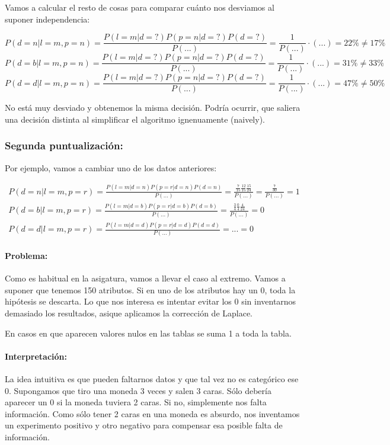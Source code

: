 \documentclass{apuntes}
\begin{document}
Vamos a calcular el resto de cosas para comparar cuánto nos desviamos al suponer independencia:

\[ P(d=n | l=m,p=n) = \frac{P(l=m | d=?) P(p=n | d=?) P(d=?)}{P(...)} = \frac{1}{P(...)}·\left( ... \right) = 22\% ≠ 17\% \]
\[ P(d=b | l=m,p=n) = \frac{P(l=m | d=?) P(p=n | d=?) P(d=?)}{P(...)} = \frac{1}{P(...)}·\left( ... \right) = 31\% ≠ 33\% \]
\[ P(d=d | l=m,p=n) = \frac{P(l=m | d=?) P(p=n | d=?) P(d=?)}{P(...)} = \frac{1}{P(...)}·\left( ... \right) = 47\% ≠ 50\% \]

No está muy desviado y obtenemos la misma decisión. Podría ocurrir, que saliera una decisión distinta al simplificar el algoritmo ignenuamente (naively).

\subsubsection{Segunda puntualización: }

Por ejemplo, vamos a cambiar uno de los datos anteriores:

\begin{gather*}
P(d=n | l=m,p=r) = \frac{P(l=m|d= n) P(p=r | d = n) P(d = n)}{P(...)} = \frac{\frac{7}{15}\frac{12}{15}\frac{15}{24}}{P(...)} = \frac{\frac{7}{30}}{P(...)} = 1\\
P(d=b | l=m,p=r) = \frac{P(l=m|d= b) P(p=r | d = b) P(d = b)}{P(...)} = \frac{\frac{3}{4}\frac{0}{4}\frac{4}{24}}{P(...)} = 0\\
P(d=d | l=m,p=r) = \frac{P(l=m|d= d) P(p=r | d = d) P(d = d)}{P(...)} = ... = 0
\end{gather*}


\paragraph{Problema: } Como es habitual en la asigatura, vamos a llevar el caso al extremo. Vamos a suponer que tenemos 150 atributos. Si en uno de los atributos hay un 0, toda la hipótesis se descarta. Lo que nos interesa es intentar evitar los $0$ sin inventarnos demasiado los resultados, asique aplicamos la corrección de Laplace.

\begin{defn}
En casos en que aparecen valores nulos en las tablas se suma  1 a toda la tabla.
\end{defn}
\paragraph{Interpretación: } La idea intuitiva es que pueden faltarnos datos y que tal vez no es categórico ese $0$. Supongamos que tiro una moneda 3 veces y salen 3 caras. Sólo debería aparecer un $0$ si la moneda tuviera 2 caras. Si no, simplemente nos falta información. Como sólo tener 2 caras en una moneda es absurdo, nos inventamos un experimento positivo y otro negativo para compensar esa posible falta de información.
\end{document}
